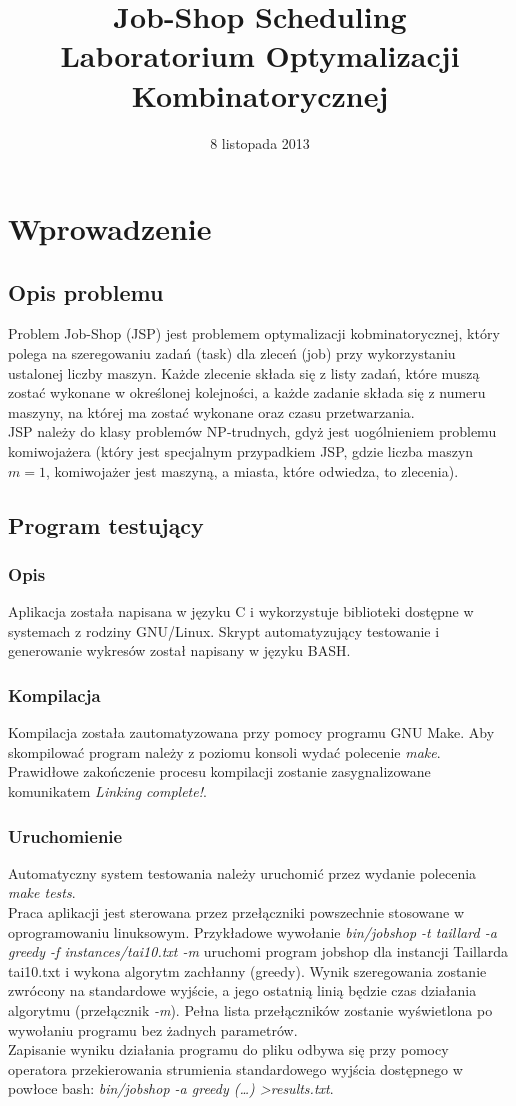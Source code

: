 \documentclass[10pt,a4paper]{article}
\author{\authorthing}
\date{8 listopada 2013}
\title{Job-Shop Scheduling\\Laboratorium Optymalizacji Kombinatorycznej}
\begin{document}
\maketitle
\section{Wprowadzenie}
\subsection{Opis problemu}
Problem Job-Shop (JSP) jest problemem optymalizacji kobminatorycznej, który polega na szeregowaniu zadań (task) dla zleceń (job) przy wykorzystaniu ustalonej liczby maszyn. Każde zlecenie składa się z listy zadań, które muszą zostać wykonane w określonej kolejności, a każde zadanie składa się z numeru maszyny, na której ma zostać wykonane oraz czasu przetwarzania.\\
JSP należy do klasy problemów NP-trudnych, gdyż jest uogólnieniem problemu komiwojażera (który jest specjalnym przypadkiem JSP, gdzie liczba maszyn $m=1$, komiwojażer jest maszyną, a miasta, które odwiedza, to zlecenia).
\subsection{Program testujący}
\subsubsection{Opis}
Aplikacja została napisana w języku C i wykorzystuje biblioteki dostępne w systemach z rodziny GNU/Linux. Skrypt automatyzujący testowanie i generowanie wykresów został napisany w języku BASH.
\subsubsection{Kompilacja}
Kompilacja została zautomatyzowana przy pomocy programu GNU Make. Aby skompilować program należy z poziomu konsoli wydać polecenie \textit{make}. Prawidłowe zakończenie procesu kompilacji zostanie zasygnalizowane komunikatem \textit{Linking complete!}.
\subsubsection{Uruchomienie}
Automatyczny system testowania należy uruchomić przez wydanie polecenia \textit{make tests}.\\
Praca aplikacji jest sterowana przez przełączniki powszechnie stosowane w oprogramowaniu linuksowym. Przykładowe wywołanie \textit{bin/jobshop -t taillard -a greedy -f instances/tai10.txt -m} uruchomi program jobshop dla instancji Taillarda tai10.txt i wykona algorytm zachłanny (greedy). Wynik szeregowania zostanie zwrócony na standardowe wyjście, a jego ostatnią linią będzie czas działania algorytmu (przełącznik \textit{-m}). Pełna lista przełączników zostanie wyświetlona po wywołaniu programu bez żadnych parametrów.\\
Zapisanie wyniku działania programu do pliku odbywa się przy pomocy operatora przekierowania strumienia standardowego wyjścia dostępnego w powłoce bash: \textit{bin/jobshop -a greedy (\ldots) \textgreater results.txt}.
\end{document}
